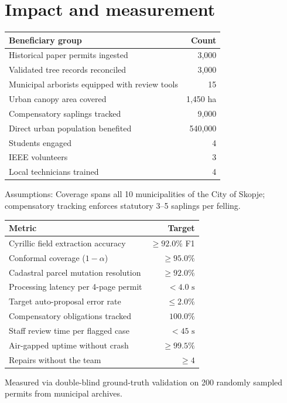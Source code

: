 \documentclass[9pt,a4paper]{article}
\begin{document}
\section{Impact and measurement}
\begin{minipage}{0.48\textwidth}
\renewcommand{\arraystretch}{0.91}
\begin{tabularx}{\textwidth}{@{}Xr@{}}
\toprule
\textsf{\textbf{\fontsize{8pt}{10pt}\selectfont Beneficiary group}} & \textsf{\textbf{\fontsize{8pt}{10pt}\selectfont Count}} \\
\midrule
Historical paper permits ingested & 3,000 \\
Validated tree records reconciled & 3,000 \\
Municipal arborists equipped with review tools & 15 \\
Urban canopy area covered & 1,450 ha \\
Compensatory saplings tracked & 9,000 \\
Direct urban population benefited & 540,000 \\
Students engaged & 4 \\
IEEE volunteers & 3 \\
Local technicians trained & 4 \\
\bottomrule
\end{tabularx}
\vspace{0.1em}
\tiny Assumptions: Coverage spans all 10 municipalities of the City of Skopje; compensatory tracking enforces statutory 3--5 saplings per felling.
\end{minipage}
\hfill
\begin{minipage}{0.48\textwidth}
\renewcommand{\arraystretch}{0.91}
\begin{tabularx}{\textwidth}{@{}Xr@{}}
\toprule
\textsf{\textbf{\fontsize{8pt}{10pt}\selectfont Metric}} & \textsf{\textbf{\fontsize{8pt}{10pt}\selectfont Target}} \\
\midrule
Cyrillic field extraction accuracy & $\ge 92.0\%$ F1 \\
Conformal coverage ($1 - \alpha$) & $\ge 95.0\%$ \\
Cadastral parcel mutation resolution & $\ge 92.0\%$ \\
Processing latency per 4-page permit & $< 4.0\text{ s}$ \\
Target auto-proposal error rate & $\le 2.0\%$ \\
Compensatory obligations tracked & $100.0\%$ \\
Staff review time per flagged case & $< 45\text{ s}$ \\
Air-gapped uptime without crash & $\ge 99.5\%$ \\
Repairs without the team & $\ge 4$ \\
\bottomrule
\end{tabularx}
\vspace{0.1em}
\tiny Measured via double-blind ground-truth validation on 200 randomly sampled permits from municipal archives.
\end{minipage}
\end{document}
